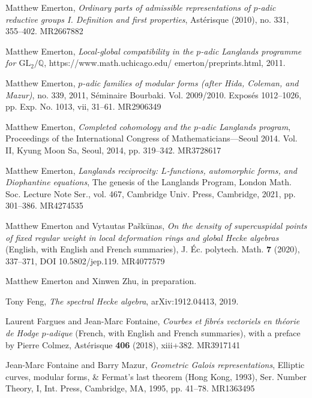 \item[{[Eme10]}] Matthew Emerton, \emph{Ordinary parts of admissible representations of $p$-adic reductive groups I. Definition and first properties}, Ast\'erisque (2010), no. 331, 355--402. MR2667882
\item[{[Eme11a]}] Matthew Emerton, \emph{Local-global compatibility in the $p$-adic Langlands programme for $\mathrm{GL}_2/\mathbb{Q}$}, https://www.math.uchicago.edu/ emerton/preprints.html, 2011.
\item[{[Eme11b]}] Matthew Emerton, \emph{$p$-adic families of modular forms (after Hida, Coleman, and Mazur)}, no. 339, 2011, S\'eminaire Bourbaki. Vol. 2009/2010. Expos\'es 1012--1026, pp. Exp. No. 1013, vii, 31--61. MR2906349
\item[{[Eme14]}] Matthew Emerton, \emph{Completed cohomology and the $p$-adic Langlands program}, Proceedings of the International Congress of Mathematicians---Seoul 2014. Vol. II, Kyung Moon Sa, Seoul, 2014, pp. 319--342. MR3728617
\item[{[Eme21]}] Matthew Emerton, \emph{Langlands reciprocity: $L$-functions, automorphic forms, and Diophantine equations}, The genesis of the Langlands Program, London Math. Soc. Lecture Note Ser., vol. 467, Cambridge Univ. Press, Cambridge, 2021, pp. 301--386. MR4274535
\item[{[EP20]}] Matthew Emerton and Vytautas Pa\v{s}k\={u}nas, \emph{On the density of supercuspidal points of fixed regular weight in local deformation rings and global Hecke algebras} (English, with English and French summaries), J. \'Ec. polytech. Math. \textbf{7} (2020), 337--371, DOI 10.5802/jep.119. MR4077579
\item[{[EZ]}] Matthew Emerton and Xinwen Zhu, in preparation.
\item[{[Fen19]}] Tony Feng, \emph{The spectral Hecke algebra}, arXiv:1912.04413, 2019.
\item[{[FF18]}] Laurent Fargues and Jean-Marc Fontaine, \emph{Courbes et fibr\'es vectoriels en th\'eorie de Hodge $p$-adique} (French, with English and French summaries), with a preface by Pierre Colmez, Ast\'erisque \textbf{406} (2018), xiii+382. MR3917141
\item[{[FM95]}] Jean-Marc Fontaine and Barry Mazur, \emph{Geometric Galois representations}, Elliptic curves, modular forms, \& Fermat's last theorem (Hong Kong, 1993), Ser. Number Theory, I, Int. Press, Cambridge, MA, 1995, pp. 41--78. MR1363495
